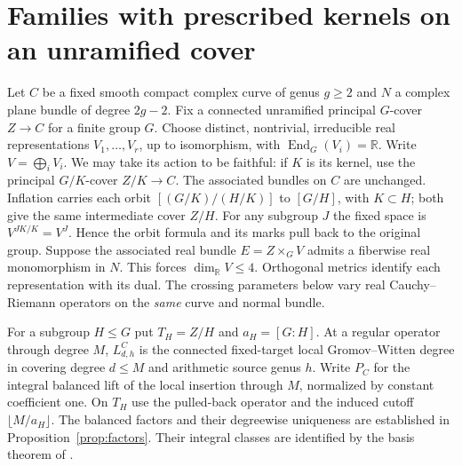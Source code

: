 \section{Families with prescribed kernels on an unramified cover}\label{sec:family}
Let \(C\) be a fixed smooth compact complex curve of genus \(g\ge2\) and \(N\) a complex plane bundle of degree \(2g-2\). Fix a connected unramified principal \(G\)-cover \(Z\to C\) for a finite group \(G\). Choose distinct, nontrivial, irreducible real representations \(V_1,\dots,V_r\), up to isomorphism, with \(\operatorname{End}_G(V_i)=\mathbb R\). Write \(V=\bigoplus_i V_i\). We may take its action to be faithful:
if \(K\) is its kernel, use the principal \(G/K\)-cover \(Z/K\to C\).
The associated bundles on \(C\) are unchanged. Inflation carries each
orbit \([(G/K)/(H/K)]\) to \([G/H]\), with \(K\subset H\); both
give the same intermediate cover \(Z/H\). For any subgroup \(J\)
the fixed space is \(V^{JK/K}=V^J\). Hence the orbit formula and its
marks pull back to the original group. Suppose the associated real bundle \(E=Z\times_G V\) admits a fiberwise real monomorphism in \(N\). This forces \(\dim_{\mathbb R}V\le4\). Orthogonal metrics identify each representation with its dual. The crossing parameters below vary real Cauchy--Riemann operators on the \emph{same} curve and normal bundle.

For a subgroup \(H\le G\) put \(T_H=Z/H\) and \(a_H=[G:H]\). At a regular operator through degree \(M\), \(L^C_{d,h}\) is the connected fixed-target local Gromov--Witten degree in covering degree \(d\le M\) and arithmetic source genus \(h\). Write \(P_C\) for the integral balanced lift of the local insertion through \(M\), normalized by constant coefficient one. On \(T_H\) use the pulled-back operator and the induced cutoff \(\lfloor M/a_H\rfloor\). The balanced factors and their degreewise uniqueness are established in Proposition~\ref{prop:factors}. Their integral classes are identified by the basis theorem of \cite[Theorem~1.1]{WueGenerators}.

